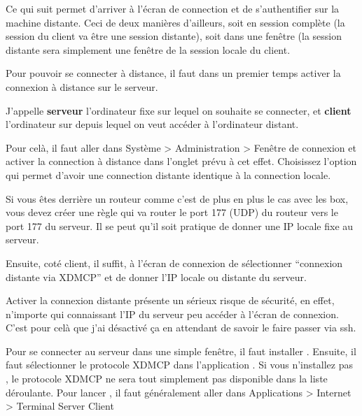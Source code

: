 \documentclass[a4paper,twoside]{article}
\begin{document}
Ce qui suit permet d'arriver à l'écran de connection et de s'authentifier sur la machine distante. Ceci de deux manières d'ailleurs, soit en session complète (la session du client va être une session distante), soit dans une fenêtre (la session distante sera simplement une fenêtre de la session locale du client.

\bigskip

Pour pouvoir se connecter à distance, il faut dans un premier temps activer la connexion à distance sur le serveur.

\begin{remarque}
J'appelle \textbf{serveur} l'ordinateur fixe sur lequel on souhaite se connecter, et \textbf{client} l'ordinateur sur depuis lequel on veut accéder à l'ordinateur distant.
\end{remarque}

Pour celà, il faut aller dans Système > Administration > Fenêtre de connexion et activer la connection à distance dans l'onglet prévu à cet effet. Choisissez l'option qui permet d'avoir une connection distante identique à la connection locale.

Si vous êtes derrière un routeur comme c'est de plus en plus le cas avec les box, vous devez créer une règle qui va router le port 177 (UDP) du routeur vers le port 177 du serveur. Il se peut qu'il soit pratique de donner une IP locale fixe au serveur.

\bigskip

Ensuite, coté client, il suffit, à l'écran de connexion de sélectionner ``connexion distante via XDMCP'' et de donner l'IP locale ou distante du serveur.

\begin{attention}
Activer la connexion distante présente un sérieux risque de sécurité, en effet, n'importe qui connaissant l'IP du serveur peu accéder à l'écran de connexion. C'est pour celà que j'ai désactivé ça en attendant de savoir le faire passer via ssh.
\end{attention}

Pour se connecter au serveur dans une simple fenêtre, il faut installer . Ensuite, il faut sélectionner le protocole XDMCP dans l'application . Si vous n'installez pas , le protocole XDMCP ne sera tout simplement pas disponible dans la liste déroulante. Pour lancer , il faut généralement aller dans Applications > Internet > Terminal Server Client
\end{document}

